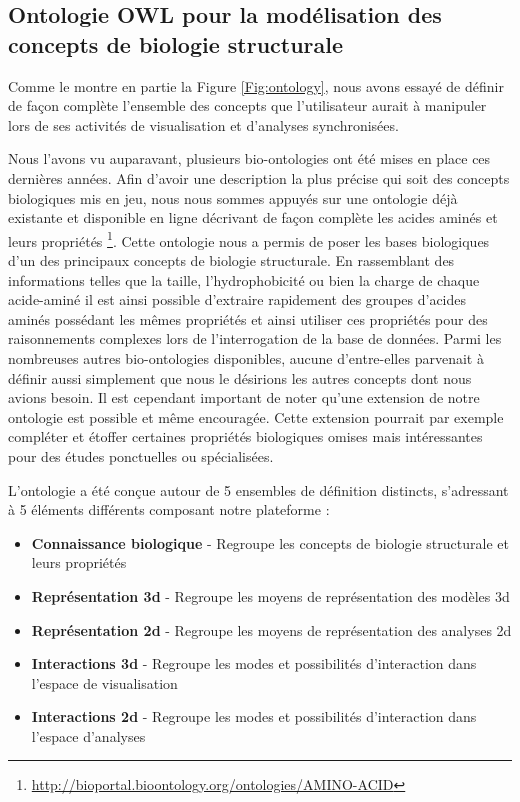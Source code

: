 \subsection{Ontologie OWL pour la modélisation des concepts de biologie structurale} \label{owl_ontology}

Comme le montre en partie la Figure \ref{Fig:ontology}, nous avons essayé de définir de façon complète l'ensemble des concepts que l'utilisateur aurait à manipuler lors de ses activités de visualisation et d'analyses synchronisées. 

Nous l'avons vu auparavant, plusieurs bio-ontologies ont été mises en place ces dernières années. Afin d'avoir une description la plus précise qui soit des concepts biologiques mis en jeu, nous nous sommes appuyés sur une ontologie déjà existante et disponible en ligne décrivant de façon complète les acides aminés et leurs propriétés \footnote{\url{http://bioportal.bioontology.org/ontologies/AMINO-ACID}}. Cette ontologie nous a permis de poser les bases biologiques d'un des principaux concepts de biologie structurale. En rassemblant des informations telles que la taille, l'hydrophobicité ou bien la charge de chaque acide-aminé il est ainsi possible d'extraire rapidement des groupes d'acides aminés possédant les mêmes propriétés et ainsi utiliser ces propriétés pour des raisonnements complexes lors de l'interrogation de la base de données. Parmi les nombreuses autres bio-ontologies disponibles, aucune d'entre-elles parvenait à définir aussi simplement que nous le désirions les autres concepts dont nous avions besoin. Il est cependant important de noter qu'une extension de notre ontologie est possible et même encouragée. Cette extension pourrait par exemple compléter et étoffer certaines propriétés biologiques omises mais intéressantes pour des études ponctuelles ou spécialisées.

L'ontologie a été conçue autour de 5 ensembles de définition distincts, s'adressant à 5 éléments différents composant notre plateforme : 

\begin{itemize}
  \item \textbf{Connaissance biologique} - Regroupe les concepts de biologie structurale et leurs propriétés
  \item \textbf{Représentation 3d} - Regroupe les moyens de représentation des modèles 3d
  \item \textbf{Représentation 2d} - Regroupe les moyens de représentation des analyses 2d
  \item \textbf{Interactions 3d} - Regroupe les modes et possibilités d'interaction dans l'espace de visualisation
  \item \textbf{Interactions 2d} - Regroupe les modes et possibilités d'interaction dans l'espace d'analyses
\end{itemize}

